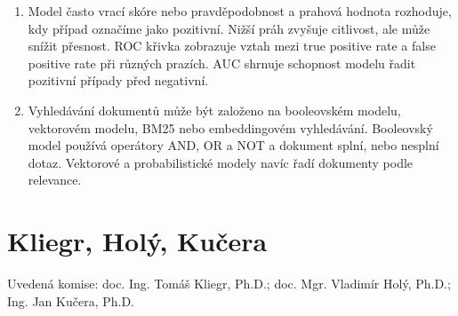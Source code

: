 \documentclass[12pt,a4paper]{article}
\begin{document}
\begin{enumerate}
  Logistická regrese modeluje logaritmus odds:
  \[
    \log\frac{p}{1-p}=x^\top\beta.
  \]
  Koeficient \(\beta_j\) říká změnu log-odds při jednotkové změně \(x_j\). Po exponenciaci
  \(e^{\beta_j}\) dostaneme odds ratio. Pokud je \(e^{\beta_j}=1{,}5\), odds jsou při jednotkové změně
  proměnné 1,5krát vyšší, za jinak stejných podmínek.

  \item {}

  Model často vrací skóre nebo pravděpodobnost a prahová hodnota rozhoduje, kdy případ označíme jako
  pozitivní. Nižší práh zvyšuje citlivost, ale může snížit přesnost. ROC křivka zobrazuje vztah mezi
  true positive rate a false positive rate při různých prazích. AUC shrnuje schopnost modelu řadit
  pozitivní případy před negativní.

  \item {}

  Vyhledávání dokumentů může být založeno na booleovském modelu, vektorovém modelu, BM25 nebo
  embeddingovém vyhledávání. Booleovský model používá operátory AND, OR a NOT a dokument splní, nebo
  nesplní dotaz. Vektorové a probabilistické modely navíc řadí dokumenty podle relevance.
\end{enumerate}

\section{Kliegr, Holý, Kučera}
Uvedená komise: doc. Ing. Tomáš Kliegr, Ph.D.; doc. Mgr. Vladimír Holý, Ph.D.; Ing. Jan Kučera, Ph.D.
\end{document}
